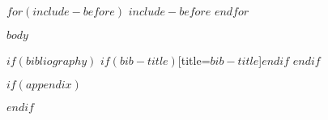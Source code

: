 \documentclass[11 pt,bibliography=totoc,listof=totoc]{scrreprt}
\begin{document}
$for(include-before)$
$include-before$
$endfor$

\setcounter{page}{1}
\tableofcontents
\listoftables
\listoffigures

\newpage
\onehalfspacing
{}


\newpage
{}
\setcounter{page}{1}

$body$

$if(bibliography)$
\printbibliography$if(bib-title)$[title=$bib-title$]$endif$
$endif$

$if(appendix)$

$endif$
\end{document}
